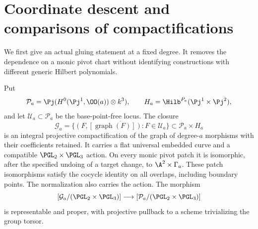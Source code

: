 \section{Coordinate descent and comparisons of compactifications}
\label{sec:equivariant-v169}
We first give an actual gluing statement at a fixed degree. It removes
the dependence on a monic pivot chart without identifying constructions
with different generic Hilbert polynomials.

\begin{theorem}
\label{thm:global-gluing-v169}
Put
\[
 \mathcal P_a=\Pj(H^0(\Pj^1,\OO(a))\otimes k^3),\qquad
 H_a=\Hilb^{P_a}(\Pj^1\times\Pj^2),
\]
and let $\mathcal U_a\subset\mathcal P_a$ be the base-point-free
locus. The closure
\[
 \mathcal G_a=\overline{\{(F,[\operatorname{graph}(F)]):
                                F\in\mathcal U_a\}}
                    \subset\mathcal P_a\times H_a
\]
is an integral projective compactification of the graph of degree-$a$
morphisms with their coefficients retained. It carries a flat universal
embedded curve and a compatible $\PGL_2\times\PGL_3$ action. On every
monic pivot patch it is isomorphic, after the specified undoing of a
target change, to $\A^2\times\Gamma_a$. These patch isomorphisms
satisfy the cocycle identity on all overlaps, including boundary points.
The normalization also carries the action. The morphism
\[
 [\mathcal G_a/(\PGL_2\times\PGL_3)]
       \longrightarrow[\mathcal P_a/(\PGL_2\times\PGL_3)]
\]
is representable and proper, with projective pullback to a scheme
trivializing the group torsor.
\end{theorem}
